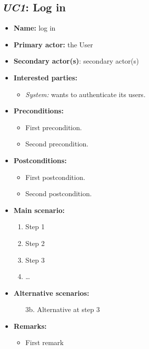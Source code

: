 \documentclass[english,peerreview]{sareport}
\begin{document}
\subsection{\emph{UC1}: Log in}
\begin{itemize}
    \item \textbf{Name:} log in
    \item \textbf{Primary actor:} the User
    \item \textbf{Secondary actor(s)}: secondary actor(s)
    \item \textbf{Interested parties:} 
        \begin{itemize}
            \item \textit{System:} wants to authenticate its users.
        \end{itemize}

    \item \textbf{Preconditions:}
        \begin{itemize}
            \item First precondition.
            \item Second precondition.
        \end{itemize}

    \item \textbf{Postconditions:}
        \begin{itemize}
            \item First postcondition.
            \item Second postcondition.
        \end{itemize}
        
    \item \textbf{Main scenario:} 
    \begin{enumerate}
       \item Step 1
       \item Step 2
       \item Step 3
       \item \ldots
    \end{enumerate}

    \item \textbf{Alternative scenarios:} 
    \begin{enumerate}
        \item [3b.] Alternative at step 3
    \end{enumerate}
    
    \item \textbf{Remarks:}
        \begin{itemize}
            \item First remark
        \end{itemize}
\end{itemize}
\end{document}
